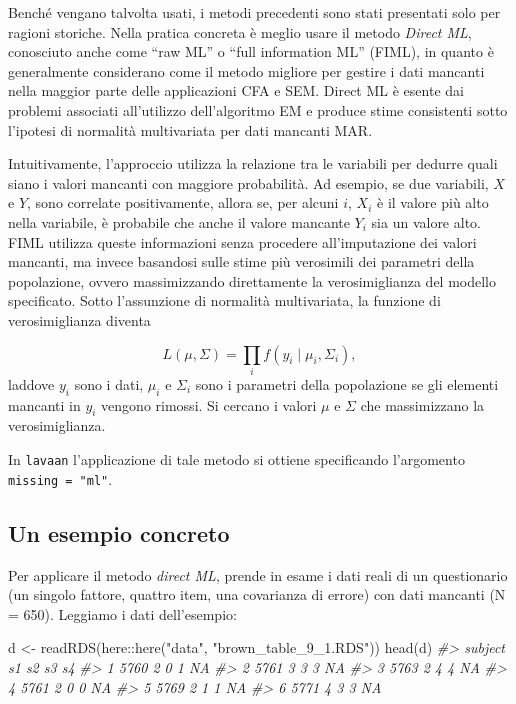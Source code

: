 \documentclass[
  11pt,
]{krantz}
\makeatletter
\newenvironment{Shaded}{\begin{snugshade}}{\end{snugshade}}
\newcommand{\CommentTok}[1]{\textcolor[rgb]{0.37,0.37,0.37}{\textit{#1}}}
\newcommand{\FunctionTok}[1]{\textcolor[rgb]{0,0,0}{#1}}
\newcommand{\NormalTok}[1]{#1}
\newcommand{\OtherTok}[1]{\textcolor[rgb]{0.37,0.37,0.37}{#1}}
\newcommand{\SpecialCharTok}[1]{\textcolor[rgb]{0,0,0}{#1}}
\newcommand{\StringTok}[1]{\textcolor[rgb]{0.5,0.5,0.5}{#1}}
\newenvironment{kframe}{%
\medskip{}
\setlength{\fboxsep}{.8em}
 \def\at@end@of@kframe{}%
 \ifinner\ifhmode%
  \def\at@end@of@kframe{\end{minipage}}%
  \begin{minipage}{\columnwidth}%
 \fi\fi%
 \def\FrameCommand##1{\hskip\@totalleftmargin \hskip-\fboxsep
 \colorbox{shadecolor}{##1}\hskip-\fboxsep
     \hskip-\linewidth \hskip-\@totalleftmargin \hskip\columnwidth}%
 \MakeFramed {\advance\hsize-\width
   \@totalleftmargin\z@ \linewidth\hsize
   \@setminipage}}%
 {\par\unskip\endMakeFramed%
 \at@end@of@kframe}
\renewenvironment{Shaded}{\begin{kframe}}{\end{kframe}}
\theoremstyle{definition}
\theoremstyle{definition}
\theoremstyle{definition}
\theoremstyle{definition}
\theoremstyle{remark}
\makeatother
\begin{document}
Benché vengano talvolta usati, i metodi precedenti sono stati presentati solo per ragioni storiche. Nella pratica concreta è meglio usare il metodo \emph{Direct ML}, conosciuto anche come ``raw ML'' o ``full information ML'' (FIML), in quanto è generalmente considerano come il metodo migliore per gestire i dati mancanti nella maggior parte delle applicazioni CFA e SEM. Direct ML è esente dai problemi associati all'utilizzo dell'algoritmo EM e produce stime consistenti sotto l'ipotesi di normalità multivariata per dati mancanti MAR.

Intuitivamente, l'approccio utilizza la relazione tra le variabili per dedurre quali siano i valori mancanti con maggiore probabilità. Ad esempio, se due variabili, \(X\) e \(Y\), sono correlate positivamente, allora se, per alcuni \(i\), \(X_i\) è il valore più alto nella variabile, è probabile che anche il valore mancante \(Y_i\) sia un valore alto. FIML utilizza queste informazioni senza procedere all'imputazione dei valori mancanti, ma invece basandosi sulle stime più verosimili dei parametri della popolazione, ovvero massimizzando direttamente la verosimiglianza del modello specificato. Sotto l'assunzione di normalità multivariata, la funzione di verosimiglianza diventa

\[
L(\mu, \Sigma) = \prod_i f(y_i \mid \mu_i, \Sigma_i),
\] laddove \(y_i\) sono i dati, \(\mu_i\) e \(\Sigma_i\) sono i parametri della popolazione se gli elementi mancanti in \(y_i\) vengono rimossi. Si cercano i valori \(\mu\) e \(\Sigma\) che massimizzano la verosimiglianza.

In \texttt{lavaan} l'applicazione di tale metodo si ottiene specificando l'argomento \texttt{missing\ =\ "ml"}.

\hypertarget{un-esempio-concreto-5}{%
\subsection{Un esempio concreto}\label{un-esempio-concreto-5}}

Per applicare il metodo \emph{direct ML}, \citet{brown2015confirmatory} prende in esame i dati reali di un questionario (un singolo fattore, quattro item, una covarianza di errore) con dati mancanti (N = 650). Leggiamo i dati dell'esempio:

\begin{Shaded}
\begin{Highlighting}[]
\NormalTok{d }\OtherTok{\textless{}{-}} \FunctionTok{readRDS}\NormalTok{(here}\SpecialCharTok{::}\FunctionTok{here}\NormalTok{(}\StringTok{"data"}\NormalTok{, }\StringTok{"brown\_table\_9\_1.RDS"}\NormalTok{))}
\FunctionTok{head}\NormalTok{(d)}
\CommentTok{\#\textgreater{}   subject s1 s2 s3 s4}
\CommentTok{\#\textgreater{} 1    5760  2  0  1 NA}
\CommentTok{\#\textgreater{} 2    5761  3  3  3 NA}
\CommentTok{\#\textgreater{} 3    5763  2  4  4 NA}
\CommentTok{\#\textgreater{} 4    5761  2  0  0 NA}
\CommentTok{\#\textgreater{} 5    5769  2  1  1 NA}
\CommentTok{\#\textgreater{} 6    5771  4  3  3 NA}
\end{Highlighting}
\end{Shaded}
\end{document}
